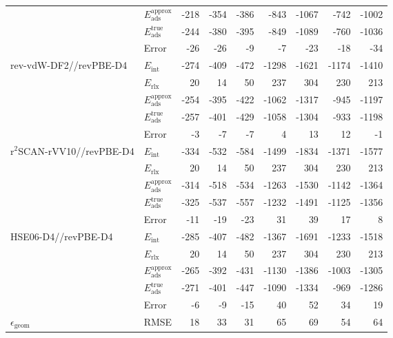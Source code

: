 \begin{table}
\begin{adjustbox}{center,max width=0.85\textwidth}
\begin{tabular}{llrrrrrrr}
 & $E_\textrm{ads}^\textrm{approx}$ & -218 & -354 & -386 & -843 & -1067 & -742 & -1002 \\
 & $E_\textrm{ads}^\textrm{true}$ & -244 & -380 & -395 & -849 & -1089 & -760 & -1036 \\
 & Error & -26 & -26 & -9 & -7 & -23 & -18 & -34 \\
\cline{1-9}
\multirow[t]{5}{*}{rev-vdW-DF2//revPBE-D4} & $E_\textrm{int}$ & -274 & -409 & -472 & -1298 & -1621 & -1174 & -1410 \\
 & $E_\textrm{rlx}$ & 20 & 14 & 50 & 237 & 304 & 230 & 213 \\
 & $E_\textrm{ads}^\textrm{approx}$ & -254 & -395 & -422 & -1062 & -1317 & -945 & -1197 \\
 & $E_\textrm{ads}^\textrm{true}$ & -257 & -401 & -429 & -1058 & -1304 & -933 & -1198 \\
 & Error & -3 & -7 & -7 & 4 & 13 & 12 & -1 \\
\cline{1-9}
\multirow[t]{5}{*}{r$^2$SCAN-rVV10//revPBE-D4} & $E_\textrm{int}$ & -334 & -532 & -584 & -1499 & -1834 & -1371 & -1577 \\
 & $E_\textrm{rlx}$ & 20 & 14 & 50 & 237 & 304 & 230 & 213 \\
 & $E_\textrm{ads}^\textrm{approx}$ & -314 & -518 & -534 & -1263 & -1530 & -1142 & -1364 \\
 & $E_\textrm{ads}^\textrm{true}$ & -325 & -537 & -557 & -1232 & -1491 & -1125 & -1356 \\
 & Error & -11 & -19 & -23 & 31 & 39 & 17 & 8 \\
\cline{1-9}
\multirow[t]{5}{*}{HSE06-D4//revPBE-D4} & $E_\textrm{int}$ & -285 & -407 & -482 & -1367 & -1691 & -1233 & -1518 \\
 & $E_\textrm{rlx}$ & 20 & 14 & 50 & 237 & 304 & 230 & 213 \\
 & $E_\textrm{ads}^\textrm{approx}$ & -265 & -392 & -431 & -1130 & -1386 & -1003 & -1305 \\
 & $E_\textrm{ads}^\textrm{true}$ & -271 & -401 & -447 & -1090 & -1334 & -969 & -1286 \\
 & Error & -6 & -9 & -15 & 40 & 52 & 34 & 19 \\
\cline{1-9}
$\epsilon_\textrm{geom}$ & RMSE & 18 & 33 & 31 & 65 & 69 & 54 & 64 \\
\cline{1-9}
\bottomrule
\end{tabular}
\end{adjustbox}
\end{table}
